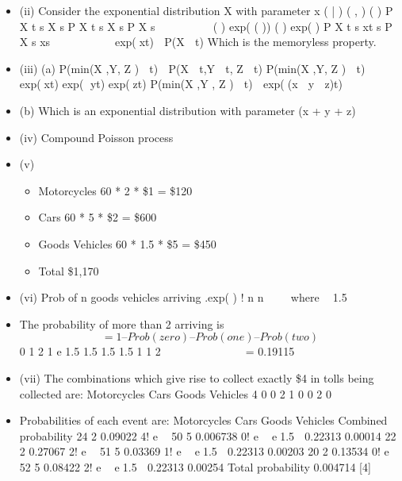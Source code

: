 \documentclass[a4paper,12pt]{article}
\begin{document}
\begin{itemize}
    \item 
(ii) Consider the exponential distribution X with parameter x
( | ) ( , )
( )
P X t s X s P X t s X s
P X s
  
   

( ) exp( ( ))
( ) exp( )
P X t s xt s
P X s xs
   
 
 
 exp(xt)  P(X  t)
Which is the memoryless property. 
\item (iii) (a) P(min(X ,Y, Z )  t)  P(X  t,Y  t, Z  t)
P(min(X ,Y, Z )  t)  exp(xt) exp( yt) exp(zt)
P(min(X ,Y , Z )  t)  exp((x  y  z)t)
\item (b) Which is an exponential distribution with parameter (x + y + z) 
\item (iv) Compound Poisson process 
\item (v)
\begin{itemize}
    \item  Motorcycles 60 * 2 * \$1 = \$120
    \item Cars 60 * 5 * \$2 = \$600
\item Goods Vehicles 60 * 1.5 * \$5 = \$450
\item Total \$1,170 
\end{itemize}

\item (vi) Prob of n goods vehicles arriving
.exp( )
!
  n
n
 
 where  1.5
\item The probability of more than 2 arriving is
\[ = 1 – Prob (zero) – Prob (one) – Prob (two)\]
0 1 2
1 e 1.5 1.5 1.5 1.5
1 1 2
  
     
 
= 0.19115 
\item (vii) The combinations which give rise to collect exactly \$4 in tolls being collected
are:
  Motorcycles
Cars Goods Vehicles
4 0 0
2 1 0
0 2 0
\item Probabilities of each event are:
  Motorcycles Cars Goods Vehicles Combined
probability
24 2 0.09022
4!
  e

50 5 0.006738
0!
  e
 e1.5  0.22313 0.00014
22 2 0.27067
2!
  e

51 5 0.03369
1!
  e
 e1.5  0.22313 0.00203
20 2 0.13534
0!
  e

52 5 0.08422
2!
  e
 e1.5  0.22313 0.00254
Total probability 0.004714 [4]
\end{itemize}

\end{document}
